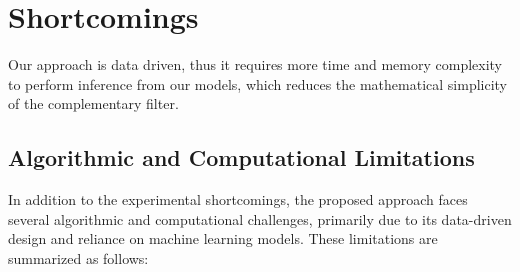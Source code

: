 \documentclass{iutbscthesis}
\begin{document}
\chapter{Shortcomings}\label{chapter:shortcomings}

Our approach is data driven, thus it requires more time and memory complexity to perform inference from our models, which reduces the mathematical simplicity of the complementary filter.

\section{Algorithmic and Computational Limitations}

In addition to the experimental shortcomings, the proposed approach faces several algorithmic and computational challenges, primarily due to its data-driven design and reliance on machine learning models. These limitations are summarized as follows:
\end{document}

